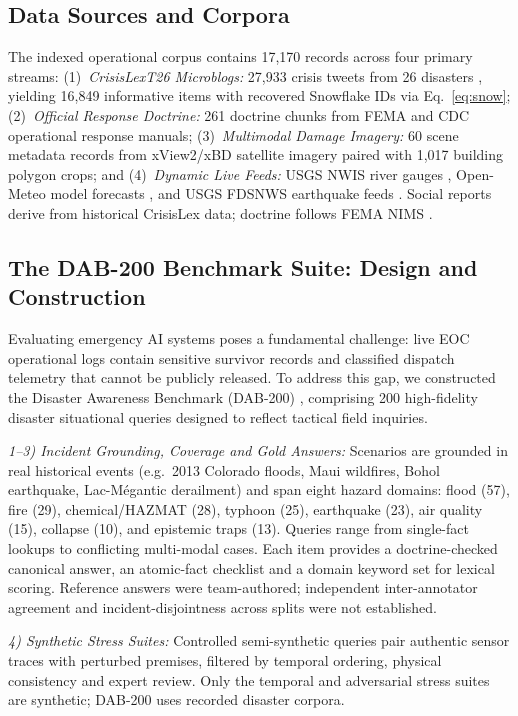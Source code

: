 \documentclass[conference]{IEEEtran}
\begin{document}
\subsection{Data Sources and Corpora}
The indexed operational corpus contains 17,170 records across four primary streams: (1)~\textit{CrisisLexT26 Microblogs:} 27,933 crisis tweets from 26 disasters \cite{olteanu2015}, yielding 16,849 informative items with recovered Snowflake IDs via Eq.~\eqref{eq:snow}; (2)~\textit{Official Response Doctrine:} 261 doctrine chunks from FEMA and CDC operational response manuals; (3)~\textit{Multimodal Damage Imagery:} 60 scene metadata records from xView2/xBD satellite imagery \cite{xview2} paired with 1,017 building polygon crops; and (4)~\textit{Dynamic Live Feeds:} USGS NWIS river gauges \cite{usgsnwis}, Open-Meteo model forecasts \cite{openmeteo}, and USGS FDSNWS earthquake feeds \cite{usgsfdsn}. Social reports derive from historical CrisisLex data; doctrine follows FEMA NIMS \cite{femanims}.

\subsection{The DAB-200 Benchmark Suite: Design and Construction}
Evaluating emergency AI systems poses a fundamental challenge: live EOC operational logs contain sensitive survivor records and classified dispatch telemetry that cannot be publicly released. To address this gap, we constructed the Disaster Awareness Benchmark (DAB-200) \cite{dab200}, comprising 200 high-fidelity disaster situational queries designed to reflect tactical field inquiries.

\textit{1--3) Incident Grounding, Coverage and Gold Answers:} Scenarios are grounded in real historical events (e.g.\ 2013 Colorado floods, Maui wildfires, Bohol earthquake, Lac-M\'{e}gantic derailment) \cite{olteanu2015} and span eight hazard domains: flood (57), fire (29), chemical/HAZMAT (28), typhoon (25), earthquake (23), air quality (15), collapse (10), and epistemic traps (13). Queries range from single-fact lookups to conflicting multi-modal cases. Each item provides a doctrine-checked canonical answer, an atomic-fact checklist and a domain keyword set for lexical scoring. Reference answers were team-authored; independent inter-annotator agreement and incident-disjointness across splits were not established.

\textit{4) Synthetic Stress Suites:} Controlled semi-synthetic queries pair authentic sensor traces with perturbed premises, filtered by temporal ordering, physical consistency and expert review. Only the temporal and adversarial stress suites are synthetic; DAB-200 uses recorded disaster corpora.
\end{document}
